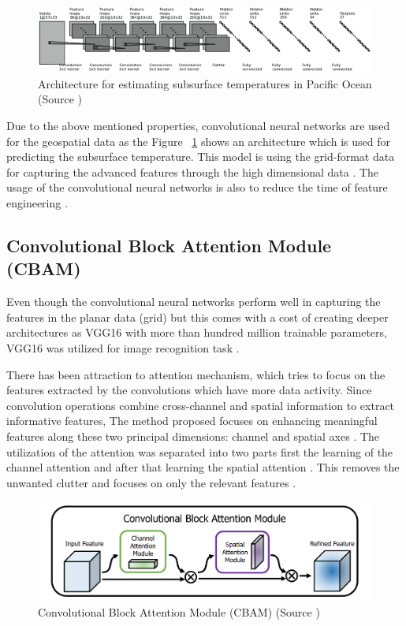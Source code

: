 \begin{figure}[h]
    \centering
    \includegraphics[width=1.0\linewidth]{figures/chapter-4/han3-2955957-large.png}
    \caption{Architecture for estimating subsurface temperatures in Pacific Ocean (Source \cite{8913542}) }
    \label{fig:architecture-pacific-ocean}
\end{figure}

Due to the above mentioned properties, convolutional neural networks are used for the geospatial data as the Figure ~\ref{fig:architecture-pacific-ocean} shows an architecture which is used for predicting the subsurface temperature.
This model is using the grid-format data for capturing the advanced features through the high dimensional data \cite{8913542}. The usage of the convolutional neural networks is also to reduce the time of feature engineering \cite{8913542}.


\subsection{Convolutional Block Attention Module (CBAM)}
Even though the convolutional neural networks perform well in capturing the features in the planar data (grid) but this comes with a cost of creating deeper architectures as VGG16\cite{simonyan2015deep} with more than hundred million trainable parameters, VGG16 was utilized for image recognition task \cite{simonyan2015deep}.

There has been attraction to attention mechanism, which tries to focus on the features extracted by the convolutions which have more data activity.
Since convolution operations combine cross-channel and spatial information to extract informative features, The method proposed \cite{woo2018cbam} focuses on enhancing meaningful features along these two principal dimensions: channel and spatial axes \cite{woo2018cbam}.
The utilization of the attention was separated into two parts first the learning of the channel attention and after that learning the spatial attention \cite{woo2018cbam}. This removes the unwanted clutter and focuses on only the relevant features \cite{woo2018cbam}.

\begin{figure}[h]
    \centering
    \includegraphics[width=1.0\linewidth]{figures/chapter-4/CBAM.png}
    \caption{Convolutional Block Attention Module (CBAM) (Source \cite{woo2018cbam}) }
    \label{fig:cbam-image}
\end{figure}

